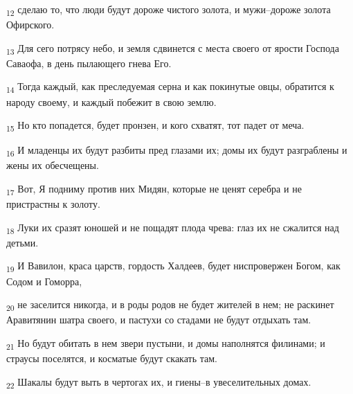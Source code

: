 \begin{tcolorbox}
\textsubscript{12} сделаю то, что люди будут дороже чистого золота, и мужи--дороже золота Офирского.
\end{tcolorbox}
\begin{tcolorbox}
\textsubscript{13} Для сего потрясу небо, и земля сдвинется с места своего от ярости Господа Саваофа, в день пылающего гнева Его.
\end{tcolorbox}
\begin{tcolorbox}
\textsubscript{14} Тогда каждый, как преследуемая серна и как покинутые овцы, обратится к народу своему, и каждый побежит в свою землю.
\end{tcolorbox}
\begin{tcolorbox}
\textsubscript{15} Но кто попадется, будет пронзен, и кого схватят, тот падет от меча.
\end{tcolorbox}
\begin{tcolorbox}
\textsubscript{16} И младенцы их будут разбиты пред глазами их; домы их будут разграблены и жены их обесчещены.
\end{tcolorbox}
\begin{tcolorbox}
\textsubscript{17} Вот, Я подниму против них Мидян, которые не ценят серебра и не пристрастны к золоту.
\end{tcolorbox}
\begin{tcolorbox}
\textsubscript{18} Луки их сразят юношей и не пощадят плода чрева: глаз их не сжалится над детьми.
\end{tcolorbox}
\begin{tcolorbox}
\textsubscript{19} И Вавилон, краса царств, гордость Халдеев, будет ниспровержен Богом, как Содом и Гоморра,
\end{tcolorbox}
\begin{tcolorbox}
\textsubscript{20} не заселится никогда, и в роды родов не будет жителей в нем; не раскинет Аравитянин шатра своего, и пастухи со стадами не будут отдыхать там.
\end{tcolorbox}
\begin{tcolorbox}
\textsubscript{21} Но будут обитать в нем звери пустыни, и домы наполнятся филинами; и страусы поселятся, и косматые будут скакать там.
\end{tcolorbox}
\begin{tcolorbox}
\textsubscript{22} Шакалы будут выть в чертогах их, и гиены--в увеселительных домах.
\end{tcolorbox}
